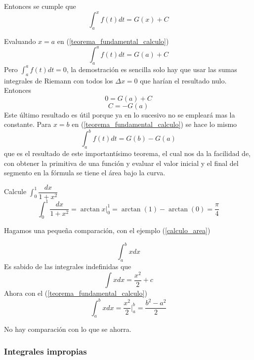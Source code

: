\documentclass[10pt,twoside]{SelfArx} %
\begin{document}
Entonces se cumple que
\begin{equation}
	\int_{a}^{x}f(t)dt=G(x)+C\label{teorema_fundamental_calculo}
\end{equation}

 Evaluando $ x=a $ en (\ref{teorema_fundamental_calculo})%
\begin{equation}
	\int_{a}^{a}f(t)dt=G(a)+C
\end{equation}
 Pero $ \int_{a}^{a}f(t)dt=0 $, la demostración es sencilla solo hay que usar las sumas integrales de Riemann con todos los $ \Delta x=0 $ que harían el resultado nulo.\\
 Entonces
 \begin{equation}
0=G(a)+C
 \end{equation}
 \begin{equation}
C=-G(a)
 \end{equation}
 Este último resultado es útil porque ya en lo sucesivo no se empleará mas la constante. Para $ x=b $ en (\ref{teorema_fundamental_calculo}) se hace lo mismo 
 \begin{equation}
 	\int_{a}^{b}f(t)dt=G(b)-G(a)
 \end{equation}
 que es el resultado de este importantísimo teorema, el cual nos da la facilidad de, con obtener la primitiva de una función y evaluar el valor inicial y el final del segmento en la fórmula se tiene el área bajo la curva.
 
\begin{ejemplo}
	Calcule $ \int_{0}^{1}\dfrac{dx}{1+x^{2}} $
	\begin{equation}
	\int_{0}^{1}\dfrac{dx}{1+x^{2}}=\arctan x\bigg|_{0}^{1}=\arctan(1)-\arctan(0)=\dfrac{\pi}{4}
	\end{equation}
\end{ejemplo} 
Hagamos una pequeña comparación, con el ejemplo (\ref{calculo_area})
\begin{ejemplo}
	\[ \int_{a}^{b}xdx \]
	Es sabido de las integrales indefinidas que
	\[ \int xdx=\dfrac{x^{2}}{2}+c \]
	Ahora con el (\ref{teorema_fundamental_calculo})
\begin{equation}
	\int_{a}^{b}xdx=\dfrac{x^{2}}{2}\bigg|_{a}^{b}=\dfrac{b^{2}-a^{2}}{2}
\end{equation}
\end{ejemplo}
No hay comparación con lo que se ahorra.





 \subsubsection{Integrales impropias}
 
\end{document}
